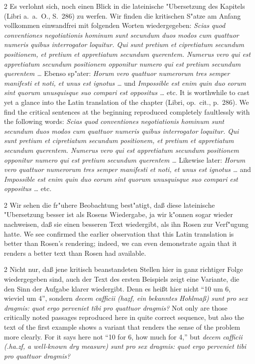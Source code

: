\documentclass[10pt,a4paper]{article}
\renewcommand{\switchcolumn}{\syncronize\nointerlineskip\columnbreak}
\newcommand{\enquote}[1]{``#1''}
\begin{document}
\begin{paracol}{2}
Es verlohnt sich, noch einen Blick in die lateinische "Ubersetzung des Kapitels (Libri a.\ a.\ O., S.\ 286) zu werfen. Wir finden die kritischen S"atze am Anfang vollkommen einwandfrei mit folgenden Worten wiedergegeben: \textit{Scias quod conventiones negotiationis hominum sunt secundum duos modos cum quattuor numeris quibus interrogator loquitur. Qui sunt pretium et cipretiatum secundum positionem, et pretium et appretiatum secundum querentem. Numerus vero qui est appretiatum secundum positionem opponitur numero qui est pretium secundum querentem \ldots{}} Ebenso sp"ater: \textit{Horum vero quattuor numerorum tres semper manifesti et noti, et unus est ignotus \ldots{}} und \textit{Impossible est enim quin duo eorum sint quorum unusquisque suo compari est oppositus \ldots{}} etc.
\switchcolumn
It is worthwhile to cast yet a glance into the Latin translation of the chapter (Libri, op.\ cit., p.\ 286). We find the critical sentences at the beginning reproduced completely faultlessly with the following words: \textit{Scias quod conventiones negotiationis hominum sunt secundum duos modos cum quattuor numeris quibus interrogator loquitur. Qui sunt pretium et cipretiatum secundum positionem, et pretium et appretiatum secundum querentem. Numerus vero qui est appretiatum secundum positionem opponitur numero qui est pretium secundum querentem \ldots{}} Likewise later: \textit{Horum vero quattuor numerorum tres semper manifesti et noti, et unus est ignotus \ldots{}} and \textit{Impossible est enim quin duo eorum sint quorum unusquisque suo compari est oppositus \ldots{}} etc.
\end{paracol}

\begin{paracol}{2}
Wir sehen die fr"uhere Beobachtung best"atigt, da\ss{} diese lateinische "Ubersetzung besser ist als Rosens Wiedergabe, ja wir k"onnen sogar wieder nachweisen, da\ss{} sie einen besseren Text wiedergibt, als ihn Rosen zur Verf"ugung hatte.
\switchcolumn
We see confirmed the earlier observation that this Latin translation is better than Rosen's rendering; indeed, we can even demonstrate again that it renders a better text than Rosen had available.
\end{paracol}

\begin{paracol}{2}
Nicht nur, da\ss{} jene kritisch beanstandeten Stellen hier in ganz richtiger Folge wiedergegeben sind, auch der Text des ersten Beispiels zeigt eine Variante, die den Sinn der Aufgabe klarer wiedergibt. Denn es hei\ss{}t hier nicht \enquote{10 um 6, wieviel um 4}, sondern \textit{decem cafficii (ha\d{z}f, ein bekanntes Hohlma\ss{}) sunt pro sex dragmis: quot ergo perveniet tibi pro quattuor dragmis?}
\switchcolumn
Not only are those critically noted passages reproduced here in quite correct sequence, but also the text of the first example shows a variant that renders the sense of the problem more clearly. For it says here not ``10 for 6, how much for 4,'' but \textit{decem cafficii (.ha.zf, a well-known dry measure) sunt pro sex dragmis: quot ergo perveniet tibi pro quattuor dragmis?}
\end{paracol}
\end{document}
